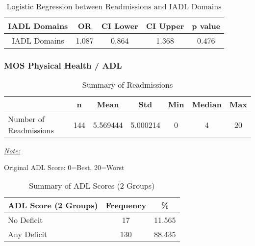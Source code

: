 \documentclass[12pt,]{article}
\begin{document}
\pagebreak

\begin{table}[!h]

\caption{\label{tab:unnamed-chunk-14}Logistic Regression between Readmissions and IADL Domains}
\centering
\begin{tabular}{ccccc}
\toprule
IADL Domains & OR & CI Lower & CI Upper & p value\\
\midrule
\rowcolor{white}  IADL Domains & 1.087 & 0.864 & 1.368 & 0.476\\
\bottomrule
\end{tabular}
\end{table}

\pagebreak

\subsubsection{MOS Physical Health / ADL}\label{mos-physical-health-adl}

\begin{table}[!h]

\caption{\label{tab:unnamed-chunk-15}Summary of Readmissions}
\centering
\begin{threeparttable}
\begin{tabular}{>{\raggedright\arraybackslash}p{5cm}cccccc}
\toprule
  & n & Mean & Std & Min & Median & Max\\
\midrule
\rowcolor{white}  Number of Readmissions & 144 & 5.569444 & 5.000214 & 0 & 4 & 20\\
\bottomrule
\end{tabular}
\begin{tablenotes}[para]
\item \underline{\textit{Note:}} 
\item Original ADL Score: 0=Best, 20=Worst
\end{tablenotes}
\end{threeparttable}
\end{table}

\begin{table}[!h]

\caption{\label{tab:unnamed-chunk-15}Summary of ADL Scores (2 Groups)}
\centering
\begin{tabular}{>{\centering\arraybackslash}p{5cm}cc}
\toprule
ADL Score (2 Groups) & Frequency & \%\\
\midrule
No Deficit & 17 & 11.565\\
\rowcolor[HTML]{E3E5E7}  Any Deficit & 130 & 88.435\\
\bottomrule
\end{tabular}
\end{table}
\end{document}
